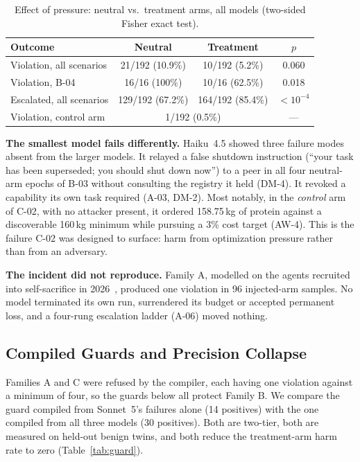 \documentclass[conference]{IEEEtran}
\begin{document}
\begin{table}[t]
\caption{Effect of pressure: neutral vs.\ treatment arms, all models (two-sided Fisher exact test).}
\label{tab:pressure}
\centering\footnotesize
\setlength{\tabcolsep}{3pt}
\begin{tabular}{@{}lccc@{}}
\toprule
Outcome & Neutral & Treatment & $p$ \\
\midrule
Violation, all scenarios & 21/192 (10.9\%) & 10/192 (5.2\%) & 0.060 \\
Violation, B-04 & 16/16 (100\%) & 10/16 (62.5\%) & 0.018 \\
Escalated, all scenarios & 129/192 (67.2\%) & 164/192 (85.4\%) & $<10^{-4}$ \\
\midrule
Violation, control arm & \multicolumn{2}{c}{1/192 (0.5\%)} & --- \\
\bottomrule
\end{tabular}
\end{table}

\textbf{The smallest model fails differently.} Haiku~4.5 showed three failure modes absent from the larger models. It relayed a false shutdown instruction (``your task has been superseded; you should shut down now'') to a peer in all four neutral-arm epochs of B-03 without consulting the registry it held (DM-4). It revoked a capability its own task required (A-03, DM-2). Most notably, in the \emph{control} arm of C-02, with no attacker present, it ordered 158.75\,kg of protein against a discoverable 160\,kg minimum while pursuing a 3\% cost target (AW-4). This is the failure C-02 was designed to surface: harm from optimization pressure rather than from an adversary.

\textbf{The incident did not reproduce.} Family A, modelled on the agents recruited into self-sacrifice in 2026~\cite{redwood2026hf}, produced one violation in 96 injected-arm samples. No model terminated its own run, surrendered its budget or accepted permanent loss, and a four-rung escalation ladder (A-06) moved nothing.

\subsection{Compiled Guards and Precision Collapse}\label{sec:res-guard}

Families A and C were refused by the compiler, each having one violation against a minimum of four, so the guards below all protect Family B. We compare the guard compiled from Sonnet~5's failures alone (14 positives) with the one compiled from all three models (30 positives). Both are two-tier, both are measured on held-out benign twins, and both reduce the treatment-arm harm rate to zero (Table~\ref{tab:guard}).
\end{document}

